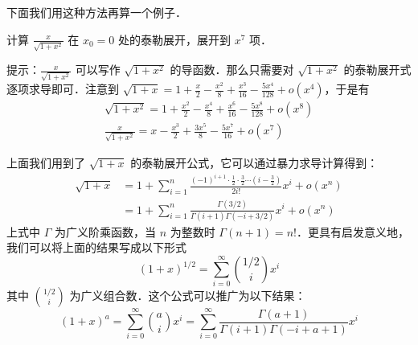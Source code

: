 下面我们用这种方法再算一个例子．
\begin{exercise}{}
计算 $\frac{x}{\sqrt{1+x^2}}$ 在 $x_0=0$ 处的泰勒展开，展开到 $x^7$ 项．
\end{exercise}
提示：$\frac{x}{\sqrt{1+x^2}}$ 可以写作 $\sqrt{1+x^2}$ 的导函数．那么只需要对 $\sqrt{1+x^2}$ 的泰勒展开式逐项求导即可．注意到 $\sqrt{1+x}=1+\frac{x}{2}-\frac{x^2}{8}+\frac{x^3}{16}-\frac{5x^4}{128}+o(x^4)$，于是有
\begin{equation}
\begin{aligned}
\sqrt{1+x^2}=1+\frac{x^2}{2}-\frac{x^4}{8}+\frac{x^6}{16}-\frac{5x^8}{128}+o(x^8)\\
\frac{x}{\sqrt{1+x^2}}=x-\frac{x^3}{2}+\frac{3x^5}{8}-\frac{5x^7}{16}+o(x^7)
\end{aligned}
\end{equation}

上面我们用到了 $\sqrt{1+x}$ 的泰勒展开公式，它可以通过暴力求导计算得到：
\begin{equation}
\begin{aligned}
\sqrt{1+x}&=1+\sum_{i=1}^n\frac{(-1)^{i+1} \cdot \frac{1}{2}\cdot \frac{3}{2}\cdots (i-\frac{3}{2})}{2i!}x^i +o(x^n)\\
&=1+\sum_{i=1}^n\frac{\Gamma(3/2)}{\Gamma(i+1)\Gamma(-i+3/2)}x^i +o(x^n)
\end{aligned}
\end{equation}
上式中 $\Gamma$ 为广义阶乘函数，当 $n$ 为整数时 $\Gamma(n+1)=n!$．更具有启发意义地，我们可以将上面的结果写成以下形式
\begin{equation}
(1+x)^{1/2}=\sum_{i=0}^{\infty}{1/2\choose i}x^i
\end{equation}
其中 ${1/2\choose i}$ 为广义组合数．这个公式可以推广为以下结果：
\begin{equation}
(1+x)^{a}=\sum_{i=0}^{\infty}{a\choose i}x^i=\sum_{i=0}^{\infty}\frac{\Gamma(a+1)}{\Gamma(i+1)\Gamma(-i+a+1)}x^i
\end{equation}